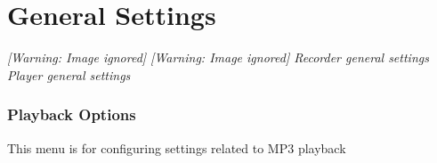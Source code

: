 \section{\label{ref:GeneralSettings}General Settings}
{\centering\mdseries\itshape
  [Warning: Image ignored] %
     [Warning: Image ignored] %
 \newline
Recorder general settings  Player general settings  
\par}

\subsubsection{\label{ref:PlaybackOptions}Playback Options}
This menu is for configuring settings related to MP3 playback

